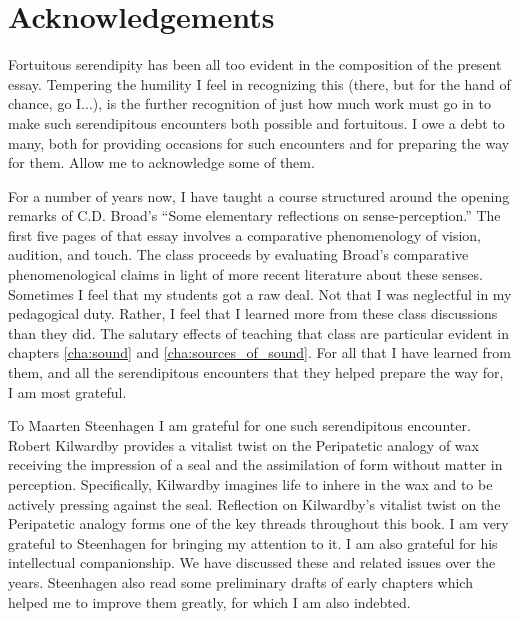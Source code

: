 \chapter*{Acknowledgements} %
\label{cha:acknowledgements}

Fortuitous serendipity has been all too evident in the composition of the present essay. Tempering the humility I feel in recognizing this (there, but for the hand of chance, go I...), is the further recognition of just how much work must go in to make such serendipitous encounters both possible and fortuitous. I owe a debt to many, both for providing occasions for such encounters and for preparing the way for them. Allow me to acknowledge some of them.

For a number of years now, I have taught a course structured around the opening remarks of C.D. Broad's ``Some elementary reflections on sense-perception.'' The first five pages of that essay involves a comparative phenomenology of vision, audition, and touch. The class proceeds by evaluating Broad's comparative phenomenological claims in light of more recent literature about these senses. Sometimes I feel that my students got a raw deal. Not that I was neglectful in my pedagogical duty. Rather, I feel that I learned more from these class discussions than they did. The salutary effects of teaching that class are particular evident in chapters \ref{cha:sound} and \ref{cha:sources_of_sound}. For all that I have learned from them, and all the serendipitous encounters that they helped prepare the way for, I am most grateful.

To Maarten Steenhagen I am grateful for one such serendipitous encounter. Robert Kilwardby provides a vitalist twist on the Peripatetic analogy of wax receiving the impression of a seal and the assimilation of form without matter in perception. Specifically, Kilwardby imagines life to inhere in the wax and to be actively pressing against the seal. Reflection on Kilwardby's vitalist twist on the Peripatetic analogy forms one of the key threads throughout this book. I am very grateful to Steenhagen for bringing my attention to it. I am also grateful for his intellectual companionship. We have discussed these and related issues over the years. Steenhagen also read some preliminary drafts of early chapters which helped me to improve them greatly, for which I am also indebted.

